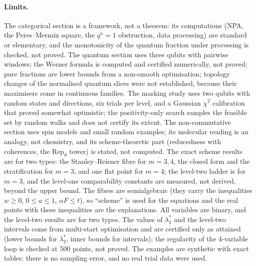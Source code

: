 \documentclass[11pt]{article}
\theoremstyle{definition}\newtheorem{definition}[theorem]{Definition}\newtheorem{remark}[theorem]{Remark}\newtheorem{example}[theorem]{Example}
\begin{document}
\paragraph{Limits.}
The categorical section is a framework, not a theorem: its computations (NPA, the Peres--Mermin square, the $q^n=1$ obstruction, data
processing) are standard or elementary, and the monotonicity of the quantum fraction under processing is checked, not proved. The quantum section uses three qubits with pairwise windows; the Werner formula is computed and certified numerically, not proved; pure
fractions are lower bounds from a non-smooth optimisation; topology changes of the normalised quantum slices were not established, because
their maximisers come in continuous families. The masking study uses two qubits with random states and directions, six trials per level, and a Gaussian $\chi^2$ calibration that proved
somewhat optimistic; the positivity-only search samples the feasible set by random walks and does not certify its extent. The non-commutative section uses spin models and small random examples; its molecular reading is an analogy, not chemistry, and its
scheme-theoretic part (reducedness with coherences, the $\mathrm{Rep}_d$ tower) is stated, not computed. The exact scheme results are for two types: the Stanley--Reisner fibre for $m=3,4$, the closed form and the stratification for $m=3$, and
one flat point for $m=4$; the level-two ladder is for $m=3$, and the level-one comparability constants are measured, not derived, beyond
the upper bound. The fibres are semialgebraic (they carry the inequalities $w\ge0$, $0\le a\le1$, $\alpha F\le t$), so ``scheme'' is used for the
equations and the real points with these inequalities are the explanations. All variables are binary, and the level-two results are for
two types. The values of $\lambda_2^*$ and the level-two intervals come from multi-start optimisation and are certified only as
attained (lower bounds for $\lambda^*_2$, inner bounds for intervals); the regularity of the 4-variable loop is checked at 500 points,
not proved. The examples are synthetic with exact tables: there is no sampling error, and no real trial data were used.
\end{document}
